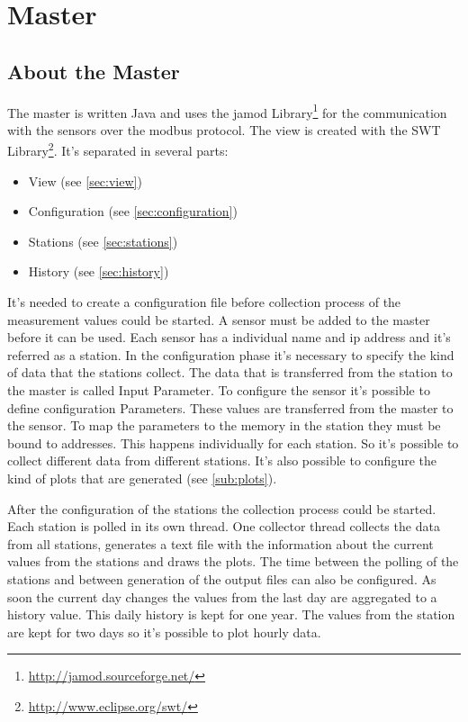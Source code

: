 
\chapter{Master}

\section{About the Master} %
\label{sec:about_the_master}

The master is written Java and uses the jamod Library\footnote{\url{http://jamod.sourceforge.net/}} for the communication with the sensors over the modbus protocol. The view is created with the SWT Library\footnote{\url{http://www.eclipse.org/swt/}}. 
It's separated in several parts:
\begin{itemize}
	\item View (see \ref{sec:view})
	\item Configuration (see \ref{sec:configuration})
	\item Stations  (see \ref{sec:stations})
	\item History (see \ref{sec:history})
\end{itemize}

It's needed to create a configuration file before collection process of the measurement values could be started. A sensor must be added to the master before it can be used. Each sensor has a individual name and ip address and it's referred as a station. In the configuration phase it's necessary to specify the kind of data that the stations collect. The data that is transferred from the station to the master is called Input Parameter. To configure the sensor it's possible to define configuration Parameters. These values are transferred from the master to the sensor. To map the parameters to the memory in the station they must be bound to addresses. This happens individually for each station. So it's possible to collect different data from different stations. It's also possible to configure the kind of plots that are generated (see \ref{sub:plots}).

After the configuration of the stations the collection process could be started. Each station is polled in its own thread. One collector thread collects the data from all stations, generates a text file with the information about the current values from the stations and draws the plots. The time between the polling of the stations and between generation of the output files can also be configured. As soon the current day changes the values from the last day are aggregated to a history value. This daily history is kept for one year. The values from the station are kept for two days so it's possible to plot hourly data. 

